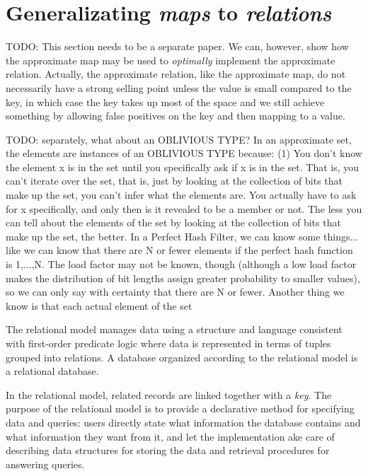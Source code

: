 \documentclass[ ../main.tex]{subfiles}
\begin{document}
\section{Generalizating \emph{maps} to \emph{relations}}
\label{sec:relations}


TODO: This section needs to be a separate paper. We can, however, show how the approximate map may be used to \emph{optimally} implement the approximate relation. Actually, the approximate relation, like the approximate map, do not necessarily have a strong selling point unless the value is small compared to the key, in which case the key takes up most of the space and we still achieve something by allowing false positives on the key and then mapping to a value.

TODO: separately, what about an OBLIVIOUS TYPE? In an approximate set, the elements are instances of an OBLIVIOUS TYPE because:
(1) You don't know the element x is in the set until you specifically ask if x is in the set. That is, you can't iterate over the set, that is, just by looking at the collection of bits that make up the set, you can't infer what the elements are. You actually have to ask for x specifically, and only then is it revealed to be a member or not. The less you can tell about the elements of the set by looking at the collection of bits that make up the set, the better. In a Perfect Hash Filter, we can know some things... like we can know that there are N or fewer elements if the perfect hash function is 1,...,N. The load factor may not be known, though (although a low load factor makes the distribution of bit lengths assign greater probability to smaller values), so we can only say with certainty that there are N or fewer. Another thing we know is that each actual element of the set

The relational model manages data using a structure and language consistent with first-order predicate logic\cite{} where data is represented in terms of tuples grouped into relations. A database organized according to the relational model is a relational database.

In the relational model, related records are linked together with a \emph{key}. The purpose of the relational model is to provide a declarative method for specifying data and queries: users directly state what information the database contains and what information they want from it, and let the implementation ake care of describing data structures for storing the data and retrieval procedures for answering queries.
\end{document}
